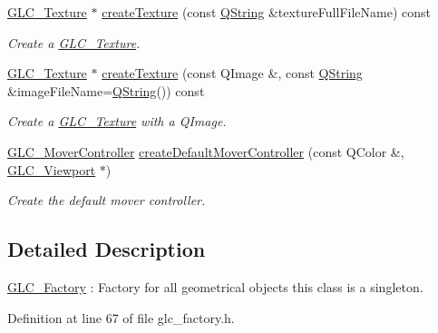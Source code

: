 \begin{DoxyCompactItemize}
\hyperlink{class_g_l_c___texture}{G\-L\-C\-\_\-\-Texture} $\ast$ \hyperlink{class_g_l_c___factory_a1b49fd511f7c3134c951498a9baabb3f}{create\-Texture} (const \hyperlink{group___u_a_v_objects_plugin_gab9d252f49c333c94a72f97ce3105a32d}{Q\-String} \&texture\-Full\-File\-Name) const 
\begin{DoxyCompactList}\small\item\em Create a \hyperlink{class_g_l_c___texture}{G\-L\-C\-\_\-\-Texture}. \end{DoxyCompactList}\item 
\hyperlink{class_g_l_c___texture}{G\-L\-C\-\_\-\-Texture} $\ast$ \hyperlink{class_g_l_c___factory_a0d02c0ab45c6e6129061709ca1af43fe}{create\-Texture} (const Q\-Image \&, const \hyperlink{group___u_a_v_objects_plugin_gab9d252f49c333c94a72f97ce3105a32d}{Q\-String} \&image\-File\-Name=\hyperlink{group___u_a_v_objects_plugin_gab9d252f49c333c94a72f97ce3105a32d}{Q\-String}()) const 
\begin{DoxyCompactList}\small\item\em Create a \hyperlink{class_g_l_c___texture}{G\-L\-C\-\_\-\-Texture} with a Q\-Image. \end{DoxyCompactList}\item 
\hyperlink{class_g_l_c___mover_controller}{G\-L\-C\-\_\-\-Mover\-Controller} \hyperlink{class_g_l_c___factory_acd7691c8a5cd432973b11ef9f4ade3a0}{create\-Default\-Mover\-Controller} (const Q\-Color \&, \hyperlink{class_g_l_c___viewport}{G\-L\-C\-\_\-\-Viewport} $\ast$)
\begin{DoxyCompactList}\small\item\em Create the default mover controller. \end{DoxyCompactList}\end{DoxyCompactItemize}


\subsection{Detailed Description}
\hyperlink{class_g_l_c___factory}{G\-L\-C\-\_\-\-Factory} \-: Factory for all geometrical objects this class is a singleton. 

Definition at line 67 of file glc\-\_\-factory.\-h.



